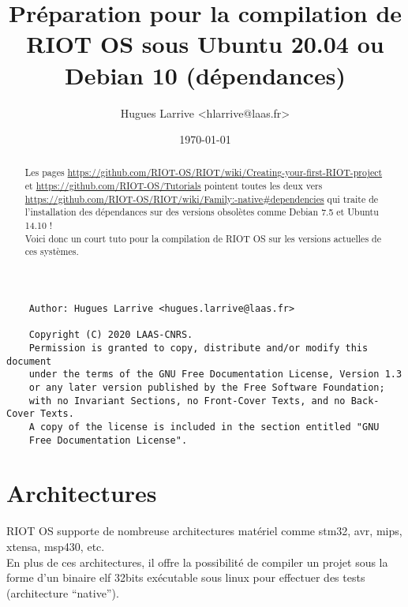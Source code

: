\documentclass[a4paper,12pt, twoside]{article}
\title{Préparation pour la compilation de RIOT OS sous Ubuntu 20.04 ou Debian 10
(dépendances)}
\author{Hugues Larrive <hlarrive@laas.fr>}
\date{\today}	%
\begin{document}
\maketitle{}


\begin{abstract}
    Les pages \url{https://github.com/RIOT-OS/RIOT/wiki/Creating-your-first-RIOT-project}
    et \url{https://github.com/RIOT-OS/Tutorials} pointent toutes les
    deux vers
    \url{https://github.com/RIOT-OS/RIOT/wiki/Family:-native#dependencies}
    qui traite de l'installation des dépendances sur des versions
    obsolètes comme Debian 7.5 et Ubuntu 14.10 !\\
    
    Voici donc un court tuto pour la compilation de RIOT OS sur les 
    versions actuelles de ces systèmes.
\end{abstract}


{\footnotesize
\begin{verbatim}
    Author: Hugues Larrive <hugues.larrive@laas.fr>

	Copyright (C) 2020 LAAS-CNRS.
	Permission is granted to copy, distribute and/or modify this document
	under the terms of the GNU Free Documentation License, Version 1.3
	or any later version published by the Free Software Foundation;
	with no Invariant Sections, no Front-Cover Texts, and no Back-Cover Texts.
	A copy of the license is included in the section entitled "GNU
	Free Documentation License".
\end{verbatim}
}

\newpage

\renewcommand{\contentsname}{Sommaire}
\tableofcontents{}


\section{Architectures}
RIOT OS supporte de nombreuse architectures matériel comme stm32, avr,
mips, xtensa, msp430, etc.\\

En plus de ces architectures, il offre la possibilité de compiler un
projet sous la forme d'un binaire elf 32bits exécutable sous linux pour
effectuer des tests (architecture \enquote{native}).\\
\end{document}
